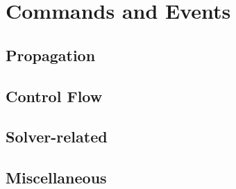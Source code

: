 \documentclass[10 pt]{book}
\begin{document}
\chapter{Commands and Events}

\section{Propagation}


\clearpage
\section{Control Flow}






\clearpage
\section{Solver-related}










\clearpage



\clearpage
\section{Miscellaneous}





















\printindex
\end{document}
